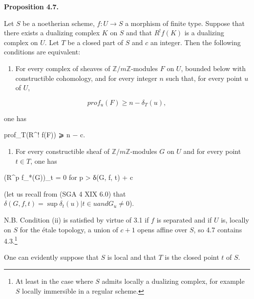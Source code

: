 \documentclass[
  11pt,
  a4paper,
]{book}
\newenvironment{Shaded}{}{}
\newcommand{\NormalTok}[1]{#1}
\providecommand{\tightlist}{%
  \setlength{\itemsep}{0pt}\setlength{\parskip}{0pt}}
\begin{document}
\textbf{Proposition 4.7.}

Let \(S\) be a noetherian scheme, \(f : U \to S\) a morphism of finite
type. Suppose that there exists a dualizing complex \(K\) on \(S\) and
that \(R^{!} f(K)\) is a dualizing complex on \(U\). Let \(T\) be a
closed part of \(S\) and \(c\) an integer. Then the following conditions
are equivalent:

\begin{enumerate}
\def\labelenumi{(\roman{enumi})}
\tightlist
\item
  For every complex of sheaves of \(\mathbb{Z}/m\mathbb{Z}\)-modules
  \(F\) on \(U\), bounded below with constructible cohomology, and for
  every integer \(n\) such that, for every point \(u\) of \(U\),
\end{enumerate}

\[ prof_{u}(F) \geqslant n - \delta_{T}(u), \]

one has

\begin{Shaded}
\begin{Highlighting}[]
\NormalTok{prof\_T(R\^{}! f(F)) ⩾ n − c.}
\end{Highlighting}
\end{Shaded}

\begin{enumerate}
\def\labelenumi{(\roman{enumi})}
\setcounter{enumi}{1}
\tightlist
\item
  For every constructible sheaf of \(\mathbb{Z}/m\mathbb{Z}\)-modules
  \(G\) on \(U\) and for every point \(t \in T\), one has
\end{enumerate}

\begin{Shaded}
\begin{Highlighting}[]
\NormalTok{(R\^{}p f\_*(G))\_t = 0 for p \textgreater{} δ(G, f, t) + c}
\end{Highlighting}
\end{Shaded}

(let us recall from (SGA 4 XIX 6.0) that
\(\delta(G, f, t) = \sup{\delta_{t}(u) | t \in {u} and G_{u} \neq 0}\)).

N.B. Condition (ii) is satisfied by virtue of 3.1 if \(f\) is separated
and if \(U\) is, locally on \(S\) for the étale topology, a union of
\(c + 1\) opens affine over \(S\), so 4.7 contains 4.3.\footnote{At
  least in the case where \(S\) admits locally a dualizing complex, for
  example \(S\) locally immersible in a regular scheme.}

One can evidently suppose that \(S\) is local and that \(T\) is the
closed point \(t\) of \(S\).
\end{document}
